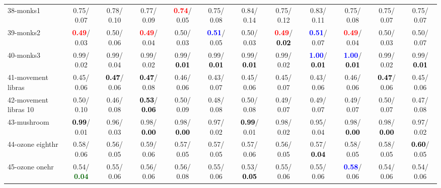\begin{table}[h]
\begin{center}
{\begin{tabular}{lc|c|c|c|c|c|c|c|c|c|c}
38-monks1 &   0.75/  0.07 &   0.78/  0.10 &   0.77/  0.09 & \textcolor{red}{\textbf{  0.74}}/  0.05 &   0.75/  0.08 &   0.84/  0.14 &   0.75/  0.12 &   0.83/  0.11 &   0.75/  0.08 &   0.75/  0.07 &   0.75/  0.07 \\
39-monks2 & \textcolor{red}{\textbf{  0.49}}/  0.03 &   0.50/  0.06 & \textcolor{red}{\textbf{  0.49}}/  0.04 &   0.50/  0.03 & \textcolor{blue}{\textbf{  0.51}}/  0.05 &   0.50/  0.03 & \textcolor{red}{\textbf{  0.49}}/\textcolor{black}{\textbf{  0.02}} & \textcolor{blue}{\textbf{  0.51}}/  0.07 & \textcolor{red}{\textbf{  0.49}}/  0.04 &   0.50/  0.03 &   0.50/  0.07 \\ \hline
40-monks3 &   0.99/  0.02 &   0.99/  0.04 &   0.99/  0.02 &   0.99/\textcolor{black}{\textbf{  0.01}} &   0.99/\textcolor{black}{\textbf{  0.01}} &   0.99/\textcolor{black}{\textbf{  0.01}} &   0.99/  0.02 & \textcolor{blue}{\textbf{  1.00}}/\textcolor{black}{\textbf{  0.01}} & \textcolor{blue}{\textbf{  1.00}}/\textcolor{black}{\textbf{  0.01}} &   0.99/  0.02 &   0.99/\textcolor{black}{\textbf{  0.01}} \\
41-movement libras &   0.45/  0.06 & \textcolor{black}{\textbf{  0.47}}/  0.06 & \textcolor{black}{\textbf{  0.47}}/  0.08 &   0.46/  0.06 &   0.43/  0.07 &   0.45/  0.06 &   0.45/  0.07 &   0.43/  0.06 &   0.46/  0.06 & \textcolor{black}{\textbf{  0.47}}/  0.06 &   0.45/  0.06 \\
42-movement libras 10 &   0.50/  0.10 &   0.46/  0.08 & \textcolor{black}{\textbf{  0.53}}/\textcolor{black}{\textbf{  0.06}} &   0.50/  0.09 &   0.48/  0.08 &   0.50/  0.08 &   0.49/  0.07 &   0.49/  0.07 &   0.49/  0.07 &   0.50/  0.07 &   0.47/  0.08 \\
43-mushroom & \textcolor{black}{\textbf{  0.99}}/  0.01 &   0.96/  0.03 &   0.98/\textcolor{black}{\textbf{  0.00}} &   0.98/\textcolor{black}{\textbf{  0.00}} &   0.97/  0.02 & \textcolor{black}{\textbf{  0.99}}/  0.01 &   0.98/  0.02 &   0.95/  0.04 &   0.98/\textcolor{black}{\textbf{  0.00}} &   0.98/\textcolor{black}{\textbf{  0.00}} &   0.97/  0.02 \\
44-ozone eighthr &   0.58/  0.06 &   0.56/  0.05 &   0.59/  0.06 &   0.57/  0.05 &   0.57/  0.05 &   0.57/  0.06 &   0.56/  0.05 &   0.57/\textcolor{black}{\textbf{  0.04}} &   0.58/  0.05 &   0.58/  0.05 & \textcolor{black}{\textbf{  0.60}}/  0.05 \\
45-ozone onehr &   0.54/\textcolor{darkgreen}{\textbf{  0.04}} &   0.55/  0.06 &   0.56/  0.06 &   0.56/  0.08 &   0.55/  0.06 &   0.53/\textcolor{black}{\textbf{  0.05}} &   0.55/  0.06 &   0.55/  0.06 & \textcolor{blue}{\textbf{  0.58}}/  0.06 &   0.54/  0.06 &   0.54/  0.06 \\

\end{tabular}}
\end{center}
\end{table}

